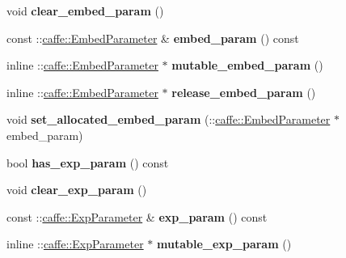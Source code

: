 \begin{DoxyCompactItemize}
void {\bfseries clear\+\_\+embed\+\_\+param} ()
\item 
\mbox{\label{classcaffe_1_1_layer_parameter_af998b9ad8079c2fb16bc78eb8388e13f}} 
const \+::\mbox{\hyperlink{classcaffe_1_1_embed_parameter}{caffe\+::\+Embed\+Parameter}} \& {\bfseries embed\+\_\+param} () const
\item 
\mbox{\label{classcaffe_1_1_layer_parameter_a4a31f3d327790713a8f70f9525de24d2}} 
inline \+::\mbox{\hyperlink{classcaffe_1_1_embed_parameter}{caffe\+::\+Embed\+Parameter}} $\ast$ {\bfseries mutable\+\_\+embed\+\_\+param} ()
\item 
\mbox{\label{classcaffe_1_1_layer_parameter_aeb8dd5ff4faf9270406e330f53613ece}} 
inline \+::\mbox{\hyperlink{classcaffe_1_1_embed_parameter}{caffe\+::\+Embed\+Parameter}} $\ast$ {\bfseries release\+\_\+embed\+\_\+param} ()
\item 
\mbox{\label{classcaffe_1_1_layer_parameter_adde763d5346ea264b1aa5a944c4febe1}} 
void {\bfseries set\+\_\+allocated\+\_\+embed\+\_\+param} (\+::\mbox{\hyperlink{classcaffe_1_1_embed_parameter}{caffe\+::\+Embed\+Parameter}} $\ast$embed\+\_\+param)
\item 
\mbox{\label{classcaffe_1_1_layer_parameter_affda6f7b6bad5e5ff1986424f3d3f2dd}} 
bool {\bfseries has\+\_\+exp\+\_\+param} () const
\item 
\mbox{\label{classcaffe_1_1_layer_parameter_a185b31a05d3eeb8156944087539d2d36}} 
void {\bfseries clear\+\_\+exp\+\_\+param} ()
\item 
\mbox{\label{classcaffe_1_1_layer_parameter_ac11ab221dcfa23cc48e8e9524d31877e}} 
const \+::\mbox{\hyperlink{classcaffe_1_1_exp_parameter}{caffe\+::\+Exp\+Parameter}} \& {\bfseries exp\+\_\+param} () const
\item 
\mbox{\label{classcaffe_1_1_layer_parameter_a8f5384a7ab21e47ae5a4bc3df46594d2}} 
inline \+::\mbox{\hyperlink{classcaffe_1_1_exp_parameter}{caffe\+::\+Exp\+Parameter}} $\ast$ {\bfseries mutable\+\_\+exp\+\_\+param} ()

\end{DoxyCompactItemize}
